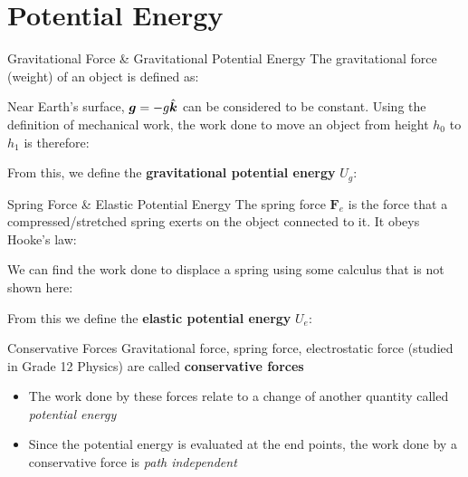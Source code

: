 \documentclass[12pt,compress,aspectratio=169]{beamer}
\newcommand{\kkk}{\ensuremath\hat{\bm{k}}}
\begin{document}
\section{Potential Energy}

\begin{frame}{Gravitational Force \& Gravitational Potential Energy}
  The gravitational force (weight) of an object is defined as:
  
  
  \vspace{-.1in}Near Earth's surface, $\bm{g}=-g\kkk$ can be considered to be
  constant. Using the definition of mechanical work, the work done to move an
  object from height $h_0$ to $h_1$ is therefore:

  \eq{-.2in}{
    W=\bm{w}\cdot\Delta\bm{h}
    =-mg\kkk\cdot\Delta h\kkk
    =-\left[mgh_1-mgh_0\right]%
  }

  From this, we define the \textbf{gravitational potential energy} $U_g$:

\end{frame}




\begin{frame}{Spring Force \& Elastic Potential Energy}
  The spring force $\bm{F}_e$ is the force that a compressed/stretched spring
  exerts on the object connected to it. It obeys Hooke's law:
    

  \vspace{-.1in}We can find the work done to displace a spring using some
  calculus that is not shown here:

  
  From this we define the \textbf{elastic potential energy} $U_e$:

\end{frame}



\begin{frame}{Conservative Forces}
  Gravitational force, spring force, electrostatic force (studied in Grade 12
  Physics) are called \textbf{conservative forces}
  \begin{itemize}
  \item The work done by these forces relate to a change of another quantity
    called \emph{potential energy}
  \item Since the potential energy is evaluated at the end points, the work
    done by a conservative force is \emph{path independent}
  \end{itemize}
\end{frame}
\end{document}
